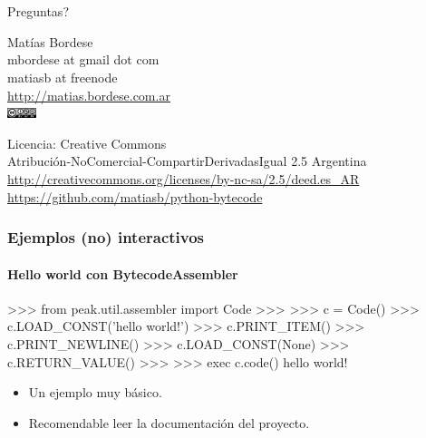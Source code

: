 \documentclass[9pt, notes=hide]{beamer}
\begin{document}
% 







\section*{}

\begin{frame}{Preguntas?}
    \begin{flushright}
        Matías Bordese\\\tiny{mbordese at gmail dot com\\matiasb at freenode}\\
        \small{\url{http://matias.bordese.com.ar}}\\

        \vspace{1cm}
        \includegraphics[height=0.3cm]{images/cc_lic.png}

        \tiny{
        Licencia: Creative Commons\\
        Atribución-NoComercial-CompartirDerivadasIgual 2.5 Argentina\\
        \url{http://creativecommons.org/licenses/by-nc-sa/2.5/deed.es\_AR}
        }\\
        \small{\url{https://github.com/matiasb/python-bytecode}}
    \end{flushright}
\end{frame}

\begin{frame}[fragile]
    \frametitle{Ejemplos (no) interactivos}
    \framesubtitle{Hello world con BytecodeAssembler}

\begin{python}
>>> from peak.util.assembler import Code
>>>
>>> c = Code()
>>> c.LOAD_CONST('hello world!')
>>> c.PRINT_ITEM()
>>> c.PRINT_NEWLINE()
>>> c.LOAD_CONST(None)
>>> c.RETURN_VALUE()
>>>
>>> exec c.code()
hello world!

\end{python}

\begin{beamerboxesrounded}[shadow=true]{}
    \begin{itemize}
        \item Un ejemplo muy básico.
        \item Recomendable leer la documentación del proyecto.
    \end{itemize}
\end{beamerboxesrounded}


\end{frame}
\end{document}
